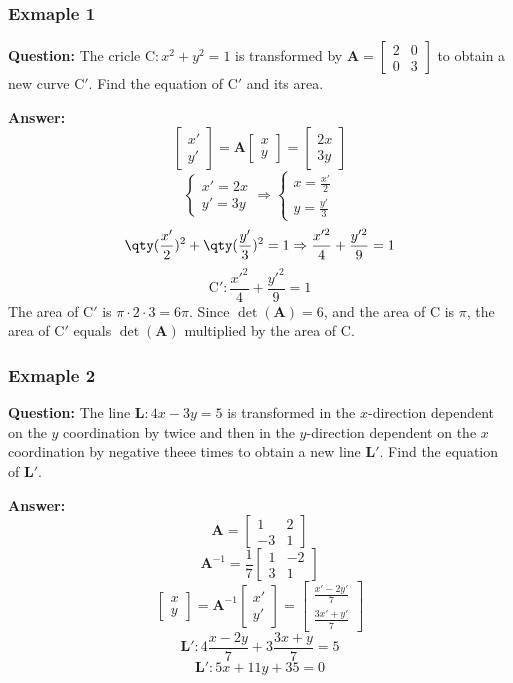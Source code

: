 \documentclass[a4paper,12pt]{report}
\begin{document}
\subsubsection{Exmaple 1}
\textbf{Question:} The cricle $\mathrm{C}: x^2+y^2=1$ is transformed by $\mathbf{A}=\begin{bmatrix}2&0\\0&3\end{bmatrix}$ to obtain a new curve $\mathrm{C}'$. Find the equation of $\mathrm{C}'$ and its area.

\textbf{Answer:} 
\[\begin{bmatrix}x'\\y'\end{bmatrix}=\mathbf{A}\begin{bmatrix}x\\y\end{bmatrix}=\begin{bmatrix}2x\\3y\end{bmatrix}\]
\[\begin{cases}x'=2x\\y'=3y\end{cases}\Rightarrow \begin{cases}x=\frac{x'}{2}\\y=\frac{y'}{3}\end{cases}\]
\[\qty(\frac{x'}{2})^2+\qty(\frac{y'}{3})^2=1\Rightarrow \frac{x'^2}{4}+\frac{y'^2}{9}=1\]
\[\mathrm{C}'\colon\frac{x'^2}{4}+\frac{y'^2}{9}=1\]
The area of $\mathrm{C}'$ is $\pi \cdot 2 \cdot 3 = 6\pi$. Since $\det(\mathbf{A}) = 6$, and the area of $\mathrm{C}$ is $\pi$, the area of $\mathrm{C}'$ equals $\det(\mathbf{A})$ multiplied by the area of $\mathrm{C}$.
\subsubsection{Exmaple 2}
\textbf{Question:} The line $\mathbf{L}: 4x - 3y = 5$ is transformed in the $x$-direction dependent on the $y$ coordination by twice and then in the $y$-direction dependent on the $x$ coordination by negative theee times to obtain a new line $\mathbf{L}'$. Find the equation of $\mathbf{L}'$.

\textbf{Answer:} 
\[\mathbf{A}=\begin{bmatrix}1&2\\-3&1\end{bmatrix}\]
\[\mathbf{A}^{-1}=\frac{1}{7}\begin{bmatrix}1&-2\\3&1\end{bmatrix}\]
\[\begin{bmatrix}x\\y\end{bmatrix}=\mathbf{A}^{-1}\begin{bmatrix}x'\\y'\end{bmatrix}=\begin{bmatrix}\frac{x'-2y'}{7}\\ \frac{3x'+y'}{7}\end{bmatrix}\]
\[\mathbf{L}': 4\frac{x-2y}{7}+3\frac{3x+y}{7}=5\]
\[\mathbf{L}': 5x+11y+35=0\]
\end{document}
